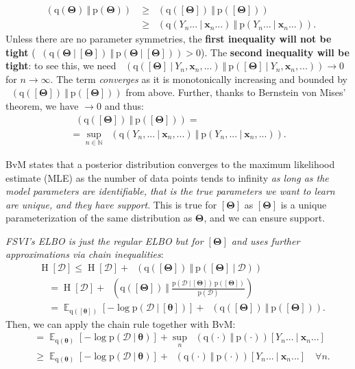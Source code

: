 \documentclass[25pt,a0paper,landscape]{tikzposter}
\DeclareMathOperator{\opExpectation}{\mathbb{E}}
\newcommand{\E}[2]{\opExpectation_{#1} \left [ #2 \right ]}
\newcommand{\MidSymbol}[1][]{\:#1\:}
\newcommand{\given}{\MidSymbol[\vert]}
\DeclareMathOperator{\opEntropy}{H}
\newcommand{\Hof}[1]{\opEntropy[#1]}
\DeclareMathOperator{\opKale}{D_\mathrm{KL}}
\newcommand{\Kale}[2]{\opKale(#1 \MidSymbol[\Vert] #2)}
\newcommand{\opp}{\mathrm{p}}
\newcommand{\pof}[1]{\opp(#1)}
\newcommand{\opq}{\mathrm{q}}
\newcommand{\qof}[1]{\opq(#1)}
\newcommand{\w}{\boldsymbol{\theta}}
\newcommand{\W}{\boldsymbol{\Theta}}
\newcommand{\Dany}{\mathcal{D}}
\newcommand{\Y}{Y}
\newcommand{\x}{\boldsymbol{x}}
\begin{document}
\begin{columns}
{\begin{multicols}{2}
\begin{proofbox}[title=Equality in the Infinite Data Limit]
\begin{align*}
      \Kale{\qof{\W}}{\pof{\W}} &\ge \Kale{\qof{[\W]}}{\pof{[\W]}} \\
      &\ge \Kale{\qof{\Y_n...\given\x_n...}}{\pof{\Y_n...\given\x_n...}}.
      \end{align*}
      Unless there are no parameter symmetries, the \textbf{first inequality will not be tight} ($\Kale{\qof{\W \given [\W]}}{\pof{\W \given [\W]}} > 0$). The \textbf{second inequality will be tight}: to see this, we need $\Kale{\qof{[\W] \given \Y_n,\x_n,...}}{\pof{[\W] \given \Y_n,\x_n,...}} \to 0$ for $n \to \infty$. The term \emph{converges} as it is monotonically increasing and bounded by $\Kale{\qof{[\W]}}{\pof{[\W]}}$ from above.
      Further, thanks to Bernstein von Mises' theorem, we have $\to 0$ and thus:
      \begin{multline*}
      \Kale{\qof{[\W]}}{\pof{[\W]}} = \\
      = \sup_{n\in \mathbb{N}} \Kale{\qof{\Y_n,...\given\x_n,...}}{\pof{\Y_n,...\given\x_n,...}}.
      \end{multline*}
    \end{proofbox}
    \begin{theorybox}[title=Bernstein von Mises' Theorem]
      BvM states that a posterior distribution converges to the maximum likelihood estimate (MLE) as the number of data points tends to infinity \emph{as long as the model parameters are identifiable, that is the true parameters we want to learn are unique, and they have support}. This is true for $[\W]$ as $[\W]$ is a unique parameterization of the same distribution as $\W$, and we can ensure support.
    \end{theorybox}
    \begin{proofbox}[title=Function-Space Variational Inference \& ELBO]
      \emph{FSVI's ELBO is just the regular ELBO but for $[\W]$ and uses further approximations via chain inequalities}:
      \begin{align*}
        &\Hof{\Dany} \le \Hof{\Dany} + \Kale{\qof{[\W]}}{\pof{[\W] \given \Dany}} \\
        &\quad = \Hof{\Dany} + \Kale{\qof{[\W]}}{\frac{\pof{\Dany \given [\W]} \, \pof{[\W]}}{\pof{\Dany}}} \\
        &\quad = 
        \E{\qof{[\w]}}{-\log \pof{\Dany \given [\w]}} + \Kale{\qof{[\W]}}{\pof{[\W]}}.
      \end{align*}
      Then, we can apply the chain rule together with BvM:
      \begin{align*}
        & = \E{\qof{\w}}{-\log \pof{\Dany \given \w}}  + \sup_n \Kale{\qof{\cdot}}{\pof{\cdot}}[\Y_n... \given \x_n...] \\
        & \ge \E{\qof{\w}}{-\log \pof{\Dany \given \w}} + \Kale{\qof{\cdot}}{\pof{\cdot}}[\Y_n... \given \x_n...] \quad \forall n.
      \end{align*}
    \end{proofbox}
    \end{multicols}
}
\end{columns}
\end{document}

